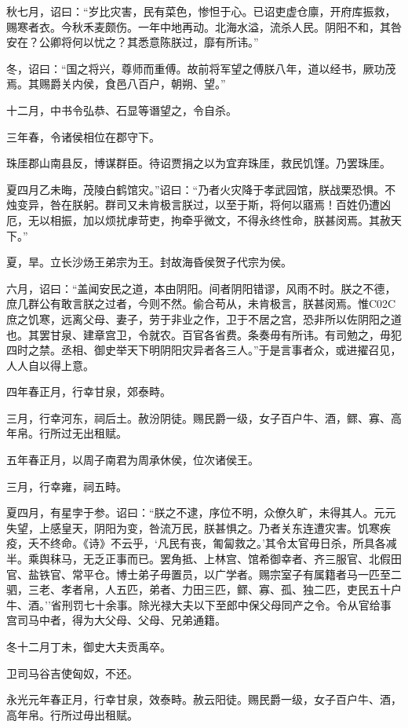 \documentclass[]{article}
\begin{document}
秋七月，诏曰：``岁比灾害，民有菜色，惨怛于心。已诏吏虚仓廪，开府库振救，赐寒者衣。今秋禾麦颇伤。一年中地再动。北海水溢，流杀人民。阴阳不和，其咎安在？公卿将何以忧之？其悉意陈朕过，靡有所讳。''

冬，诏曰：``国之将兴，尊师而重傅。故前将军望之傅朕八年，道以经书，厥功茂焉。其赐爵关内侯，食邑八百户，朝朔、望。''

十二月，中书令弘恭、石显等谮望之，令自杀。

三年春，令诸侯相位在郡守下。

珠厓郡山南县反，博谋群臣。待诏贾捐之以为宜弃珠厓，救民饥馑。乃罢珠厓。

夏四月乙未晦，茂陵白鹤馆灾。''诏曰：``乃者火灾降于孝武园馆，朕战栗恐惧。不烛变异，咎在朕躬。群司又未肯极言朕过，以至于斯，将何以寤焉！百姓仍遭凶厄，无以相振，加以烦扰虖苛吏，拘牵乎微文，不得永终性命，朕甚闵焉。其赦天下。''

夏，旱。立长沙炀王弟宗为王。封故海昏侯贺子代宗为侯。

六月，诏曰：``盖闻安民之道，本由阴阳。间者阴阳错谬，风雨不时。朕之不德，庶几群公有敢言朕之过者，今则不然。偷合苟从，未肯极言，朕甚闵焉。惟C02C庶之饥寒，远离父母、妻子，劳于非业之作，卫于不居之宫，恐非所以佐阴阳之道也。其罢甘泉、建章宫卫，令就农。百官各省费。条奏毋有所讳。有司勉之，毋犯四时之禁。丞相、御史举天下明阴阳灾异者各三人。''于是言事者众，或进擢召见，人人自以得上意。

四年春正月，行幸甘泉，郊泰畤。

三月，行幸河东，祠后土。赦汾阴徒。赐民爵一级，女子百户牛、酒，鳏、寡、高年帛。行所过无出租赋。

五年春正月，以周子南君为周承休侯，位次诸侯王。

三月，行幸雍，祠五畤。

夏四月，有星孛于参。诏曰：``朕之不逮，序位不明，众僚久旷，未得其人。元元失望，上感皇天，阴阳为变，咎流万民，朕甚惧之。乃者关东连遭灾害。饥寒疾疫，夭不终命。《诗》不云乎，`凡民有丧，匍匐救之。'其令太官毋日杀，所具各减半。乘舆秣马，无乏正事而已。罢角抵、上林宫、馆希御幸者、齐三服官、北假田官、盐铁官、常平仓。博士弟子毋置员，以广学者。赐宗室子有属籍者马一匹至二驷，三老、孝者帛，人五匹，弟者、力田三匹，鳏、寡、孤、独二匹，吏民五十户牛、酒。''省刑罚七十余事。除光禄大夫以下至郎中保父母同产之令。令从官给事宫司马中者，得为大父母、父母、兄弟通籍。

冬十二月丁未，御史大夫贡禹卒。

卫司马谷吉使匈奴，不还。

永光元年春正月，行幸甘泉，效泰畤。赦云阳徒。赐民爵一级，女子百户牛、酒，高年帛。行所过毋出租赋。
\end{document}
